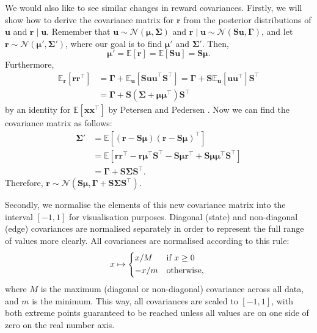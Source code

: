 \documentclass{mpaper}
\begin{document}
We would also like to see similar changes in reward covariances. Firstly, we
will show how to derive the covariance matrix for $\mathbf{r}$ from the
posterior distributions of $\mathbf{u}$ and $\mathbf{r} \mid \mathbf{u}$.
Remember that $\mathbf{u} \sim \mathcal{N}(\bm\mu, \bm\Sigma)$ and $\mathbf{r}
\mid \mathbf{u} \sim \mathcal{N}(\mathbf{Su}, \bm\Gamma)$, and let $\mathbf{r}
\sim \mathcal{N}(\bm\mu', \bm\Sigma')$, where our goal is to find $\bm\mu'$ and
$\bm\Sigma'$. Then,
\[
  \bm\mu' = \mathbb{E}[\mathbf{r}] = \mathbb{E}[\mathbf{Su}] = \mathbf{S}\bm\mu.
\]
Furthermore,
\begin{align*}
  \mathbb{E}_{\mathbf{r}}[\mathbf{rr}^\intercal] &= \bm\Gamma + \mathbb{E}_{\mathbf{u}}[\mathbf{Suu}^\intercal\mathbf{S}^\intercal] = \bm\Gamma + \mathbf{S}\mathbb{E}_{\mathbf{u}}[\mathbf{uu}^\intercal]\mathbf{S}^\intercal \\
                                                 &= \bm\Gamma + \mathbf{S}(\bm\Sigma + \bm\mu\bm\mu^\intercal)\mathbf{S}^\intercal
\end{align*}
by an identity for $\mathbb{E}[\mathbf{xx}^\intercal]$ by Petersen and Pedersen
\cite{petersen2008matrix}. Now we can find the covariance matrix as follows:
\begin{align*}
  \bm\Sigma' &= \mathbb{E}[(\mathbf{r} - \mathbf{S}\bm\mu)(\mathbf{r} -
               \mathbf{S}\bm\mu)^\intercal] \\
             &= \mathbb{E}[\mathbf{rr}^\intercal - \mathbf{r}\bm\mu^\intercal\mathbf{S}^\intercal - \mathbf{S}\bm\mu\mathbf{r}^\intercal + \mathbf{S}\bm\mu\bm\mu^\intercal\mathbf{S}^\intercal] \\
             &= \bm\Gamma + \mathbf{S}\bm\Sigma\mathbf{S}^\intercal.
\end{align*}
Therefore, $\mathbf{r} \sim \mathcal{N}(\mathbf{S}\bm\mu, \bm\Gamma +
\mathbf{S}\bm\Sigma\mathbf{S}^\intercal)$.

Secondly, we normalise the elements of this new covariance matrix into the
interval $[-1, 1]$ for visualisation purposes. Diagonal (state) and non-diagonal
(edge) covariances are normalised separately in order to represent the full
range of values more clearly. All covariances are normalised according to this
rule:
\[
  x \mapsto
  \begin{cases*}
    x/M & if $x \ge 0$ \\
    -x/m & otherwise,
  \end{cases*}
\]
where $M$ is the maximum (diagonal or non-diagonal) covariance across all data,
and $m$ is the minimum. This way, all covariances are scaled to $[-1, 1]$, with
both extreme points guaranteed to be reached unless all values are on one side
of zero on the real number axis.
\end{document}
